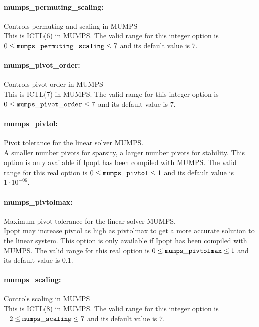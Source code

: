 \paragraph{mumps\_permuting\_scaling:}\label{sec:mumps_permuting_scaling} Controls permuting and scaling in MUMPS $\;$ \\
 This is ICTL(6) in MUMPS. The valid range for this integer option is
$0 \le {\tt mumps\_permuting\_scaling } \le 7$
and its default value is $7$.


\paragraph{mumps\_pivot\_order:}\label{sec:mumps_pivot_order} Controls pivot order in MUMPS $\;$ \\
 This is ICTL(7) in MUMPS. The valid range for this integer option is
$0 \le {\tt mumps\_pivot\_order } \le 7$
and its default value is $7$.


\paragraph{mumps\_pivtol:}\label{sec:mumps_pivtol} Pivot tolerance for the linear solver MUMPS. $\;$ \\
 A smaller number pivots for sparsity, a larger
number pivots for stability.  This option is only
available if Ipopt has been compiled with MUMPS. The valid range for this real option is 
$0 \le {\tt mumps\_pivtol } \le 1$
and its default value is $1 \cdot 10^{-06}$.


\paragraph{mumps\_pivtolmax:}\label{sec:mumps_pivtolmax} Maximum pivot tolerance for the linear solver MUMPS. $\;$ \\
 Ipopt may increase pivtol as high as pivtolmax to
get a more accurate solution to the linear
system.  This option is only available if Ipopt
has been compiled with MUMPS. The valid range for this real option is 
$0 \le {\tt mumps\_pivtolmax } \le 1$
and its default value is $0.1$.


\paragraph{mumps\_scaling:}\label{sec:mumps_scaling} Controls scaling in MUMPS $\;$ \\
 This is ICTL(8) in MUMPS. The valid range for this integer option is
$-2 \le {\tt mumps\_scaling } \le 7$
and its default value is $7$.

